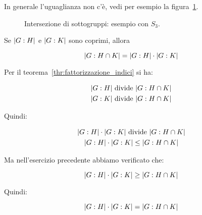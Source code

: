 In generale l'uguaglianza non c'è, vedi per esempio la figura~\ref{fig:Laterali_intersezione_di_sottogruppi_esempio_s3}.

\begin{figure}[tp]
	\centering
	\caption{Intersezione di sottogruppi: esempio con $S_3$.}
	\label{fig:Laterali_intersezione_di_sottogruppi_esempio_s3}
\end{figure}

\begin{teorema}
	Se $\lvert G:H \rvert$ e $\lvert G:K \rvert$ sono coprimi, allora
	
	\begin{equation}
		\lvert G:H \cap K \rvert = \lvert G:H \rvert \cdot \lvert G:K \rvert
	\end{equation}
\end{teorema}
\begin{dimostrazione}
	Per il teorema~\ref{thr:fattorizzazione_indici} si ha:
	
	\begin{gather}
		\lvert G:H \rvert \text{ divide } \lvert G:H \cap K \rvert \\
		\lvert G:K \rvert \text{ divide } \lvert G:H \cap K \rvert
	\end{gather}	

	Quindi:
	
	\begin{gather}
		\lvert G:H \rvert \cdot \lvert G:K \rvert \text{ divide } \lvert G:H \cap K \rvert \\
		\lvert G:H \rvert \cdot \lvert G:K \rvert \le \lvert G:H \cap K \rvert
	\end{gather}

	Ma nell'esercizio precedente abbiamo verificato che:
	
	\begin{equation}
		\lvert G:H \rvert \cdot \lvert G:K \rvert \ge \lvert G:H \cap K \rvert
	\end{equation}

	Quindi:
	
	\begin{equation}
		\lvert G:H \rvert \cdot \lvert G:K \rvert = \lvert G:H \cap K \rvert
	\end{equation}
\end{dimostrazione}

